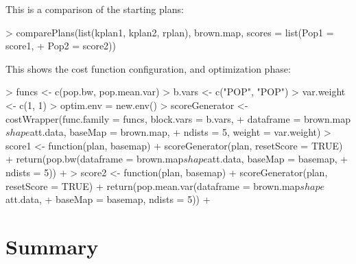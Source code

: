 \documentclass[article]{JSSstyle/jss}
\begin{document}
This is a comparison of the starting plans:

\begin{Schunk}
\begin{Sinput}
> comparePlans(list(kplan1, kplan2, rplan), brown.map, scores = list(Pop1 = score1, 
+     Pop2 = score2))
\end{Sinput}
\end{Schunk}

This shows the cost function configuration, and optimization phase:

\begin{Schunk}
\begin{Sinput}
> funcs <- c(pop.bw, pop.mean.var)
> b.vars <- c("POP", "POP")
> var.weight <- c(1, 1)
> optim.env = new.env()
> scoreGenerator <- costWrapper(func.family = funcs, block.vars = b.vars, 
+     dataframe = brown.map$shape$att.data, baseMap = brown.map, 
+     ndists = 5, weight = var.weight)
> score1 <- function(plan, basemap) {
+     scoreGenerator(plan, resetScore = TRUE)
+     return(pop.bw(dataframe = brown.map$shape$att.data, baseMap = basemap, 
+         ndists = 5))
+ }
> score2 <- function(plan, basemap) {
+     scoreGenerator(plan, resetScore = TRUE)
+     return(pop.mean.var(dataframe = brown.map$shape$att.data, 
+         baseMap = basemap, ndists = 5))
+ }
\end{Sinput}
\end{Schunk}




\begin{Schunk}
\end{Schunk}



\section{Summary}
\end{document}
